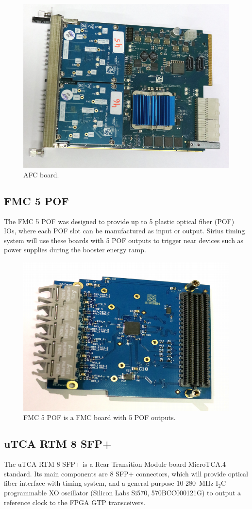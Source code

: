 \documentclass[a4paper,
               biblatex,      %
               ]{jacow}
\begin{document}
\begin{figure}[!htb]
   \centering
   \includegraphics*[width=0.8\columnwidth]{AFC_POFs_resized}
   \caption{AFC board.}
   \label{fig:afc_pofs}
\end{figure}

\subsection{FMC 5 POF}

The FMC 5 POF \cite{fmc-pof-git} was designed to provide up to 5 plastic optical fiber (POF) IOs, where each POF slot can be manufactured as input or output. Sirius timing system will use these boards with 5 POF outputs to trigger near devices such as power supplies during the booster energy ramp.

\begin{figure}[!htb]
   \centering
   \includegraphics*[width=0.5\columnwidth]{FMC_POF_resized}
   \caption{FMC 5 POF is a FMC board with 5 POF outputs.}
   \label{fig:fmc_pof}
\end{figure}

\subsection{uTCA RTM 8 SFP+}
The uTCA RTM 8 SFP+ \cite{rtm-sfp-git} is a Rear Transition Module board MicroTCA.4 standard. Its main components are 8 SFP+ connectors, which will provide optical fiber interface with timing system, and a general purpose 10-280~MHz I$_{2}$C programmable XO oscillator (Silicon Labs Si570, 570BCC000121G) to output a reference clock to the FPGA GTP transceivers. 
\end{document}
